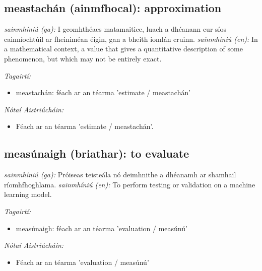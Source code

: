 \documentclass{article}
\begin{document}
\subsection*{meastachán (ainmfhocal): approximation} 
 \noindent \textit{sainmhíniú (ga):} I gcomhthéacs matamaitice, luach a dhéanann cur síos cainníochtúil ar fheiniméan éigin, gan a bheith iomlán cruinn.
\newline\newline
 \noindent \textit{sainmhíniú (en):} In a mathematical context, a value that gives a quantitative description of some phenomenon, but which may not be entirely exact.
\newline

 \noindent \textit{Tagairtí:}
\begin{itemize}
	\item meastachán: féach ar an téarma 'estimate / meastachán'
\end{itemize}

 \noindent \textit{Nótaí Aistriúcháin:}
\begin{itemize}
	\item Féach ar an téarma 'estimate / meastachán'.
\end{itemize}


\subsection*{measúnaigh (briathar): to evaluate} 
 \noindent \textit{sainmhíniú (ga):} Próiseas teisteála nó deimhnithe a dhéanamh ar shamhail ríomhfhoghlama.
\newline\newline
 \noindent \textit{sainmhíniú (en):} To perform testing or validation on a machine learning model.
\newline

 \noindent \textit{Tagairtí:}
\begin{itemize}
	\item measúnaigh: féach ar an téarma 'evaluation / measúnú'
\end{itemize}

 \noindent \textit{Nótaí Aistriúcháin:}
\begin{itemize}
	\item Féach ar an téarma 'evaluation / measúnú'
\end{itemize}
\end{document}
